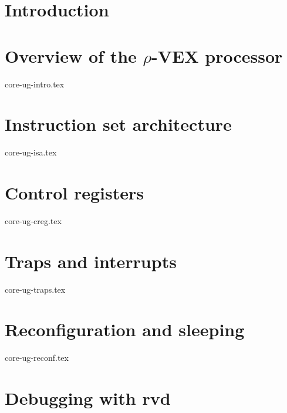 \documentclass[11pt,twoside]{ce}
\newcommand{\rvex}{\texorpdfstring{$\rho$}{r}-VEX}
\begin{document}
\let\subsection\actualsection
\let\subsubsection\actualsubsection
\let\paragraph\actualsubsubsection

\chapter{Introduction}

\chapter{Overview of the \rvex{} processor}
{core-ug-intro.tex}

\chapter{Instruction set architecture}
{core-ug-isa.tex}

\chapter{Control registers}
{core-ug-creg.tex}

\chapter{Traps and interrupts}
{core-ug-traps.tex}

\chapter{Reconfiguration and sleeping}
{core-ug-reconf.tex}

\chapter{Debugging with rvd}
\end{document}
